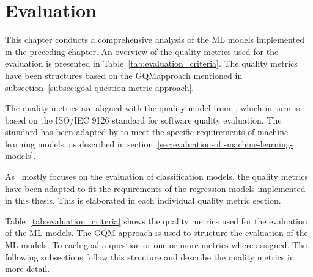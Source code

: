 \chapter{Evaluation}\label{ch:evaluation}
This chapter conducts a comprehensive analysis of the \ac{ML} models implemented in
the preceding chapter.
An overview of the quality metrics used for the evaluation is presented in
Table~\ref{tab:evaluation_criteria}.
The quality metrics have been structures based on
the \ac{GQM}approach mentioned in subsection~\ref{subsec:goal-question-metric-approach}.

The quality metrics are aligned with the quality model from~\cite{
    siebert2022construction}, which in turn is based on the ISO/IEC 9126 standard for
software quality evaluation.
The standard has been adapted by \cite{siebert2022construction} to meet the specific
requirements of machine learning models, as described in section~\ref{sec:evaluation-of
-machine-learning-models}.

As~\cite{siebert2022construction} mostly focuses on the evaluation of classification
models, the quality metrics have been adapted to fit the requirements of the regression
models implemented in this thesis.
This is elaborated in each individual quality metric section.

Table~\ref{tab:evaluation_criteria} shows the quality metrics used for the evaluation
of the \ac{ML} models.
The \ac{GQM} approach is used to structure the evaluation of the \ac{ML} models.
To each goal a question or one or more metrics where assigned.
The following subsections follow this structure and describe the quality metrics in more
detail.

